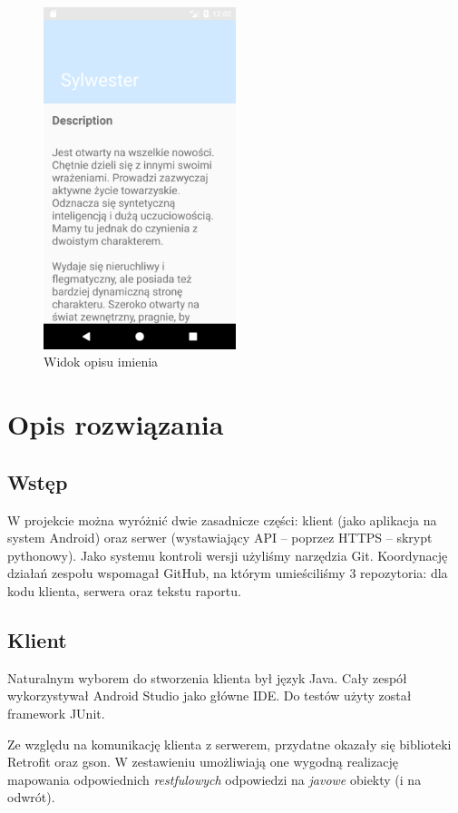 \documentclass[12pt,a4paper]{article}
\begin{document}
\begin{figure}[h]
    \caption{Widok opisu imienia}
    \centering
    \includegraphics[width=0.5\textwidth]{name_description}
\end{figure}

\section{Opis rozwiązania}
\subsection{Wstęp}

W projekcie można wyróżnić dwie zasadnicze części: klient (jako aplikacja na system Android) oraz serwer (wystawiający API -- poprzez HTTPS -- skrypt pythonowy).
Jako systemu kontroli wersji użyliśmy narzędzia Git.
Koordynację działań zespołu wspomagał GitHub, na którym umieściliśmy 3 repozytoria: dla kodu klienta, serwera oraz tekstu raportu.

\subsection{Klient}
Naturalnym wyborem do stworzenia klienta był język Java.
Cały zespół wykorzystywał Android Studio jako główne IDE.
Do testów użyty został framework JUnit.

Ze względu na komunikację klienta z serwerem, przydatne okazały się biblioteki Retrofit oraz gson.
W zestawieniu umożliwiają one wygodną realizację mapowania odpowiednich \textit{restfulowych} odpowiedzi na \textit{javowe} obiekty (i na odwrót).
\end{document}
